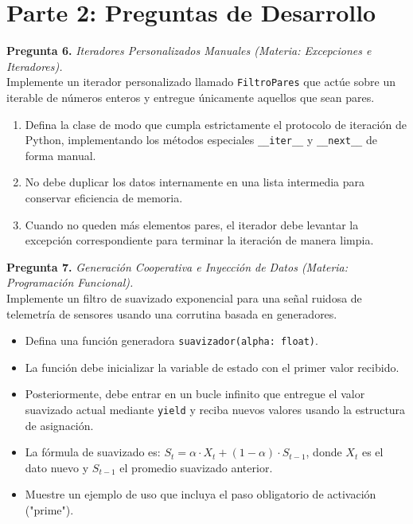 \documentclass[12pt,letterpaper]{article}
\begin{document}
\pagebreak

\section*{Parte 2: Preguntas de Desarrollo}

\textbf{Pregunta 6.} \textit{Iteradores Personalizados Manuales (Materia: Excepciones e Iteradores).} \\
Implemente un iterador personalizado llamado \texttt{FiltroPares} que actúe sobre un iterable de números enteros y entregue únicamente aquellos que sean pares.
\begin{enumerate}[label=\alph*)]
  \item Defina la clase de modo que cumpla estrictamente el protocolo de iteración de Python, implementando los métodos especiales \texttt{\_\_iter\_\_} y \texttt{\_\_next\_\_} de forma manual.
  \item No debe duplicar los datos internamente en una lista intermedia para conservar eficiencia de memoria.
  \item Cuando no queden más elementos pares, el iterador debe levantar la excepción correspondiente para terminar la iteración de manera limpia.
\end{enumerate}

\bigskip

\textbf{Pregunta 7.} \textit{Generación Cooperativa e Inyección de Datos (Materia: Programación Funcional).} \\
Implemente un filtro de suavizado exponencial para una señal ruidosa de telemetría de sensores usando una corrutina basada en generadores.
\begin{itemize}
  \item Defina una función generadora \texttt{suavizador(alpha: float)}.
  \item La función debe inicializar la variable de estado con el primer valor recibido.
  \item Posteriormente, debe entrar en un bucle infinito que entregue el valor suavizado actual mediante \texttt{yield} y reciba nuevos valores usando la estructura de asignación.
  \item La fórmula de suavizado es: $S_t = \alpha \cdot X_t + (1 - \alpha) \cdot S_{t-1}$, donde $X_t$ es el dato nuevo y $S_{t-1}$ el promedio suavizado anterior.
  \item Muestre un ejemplo de uso que incluya el paso obligatorio de activación ("prime").
\end{itemize}
\end{document}
